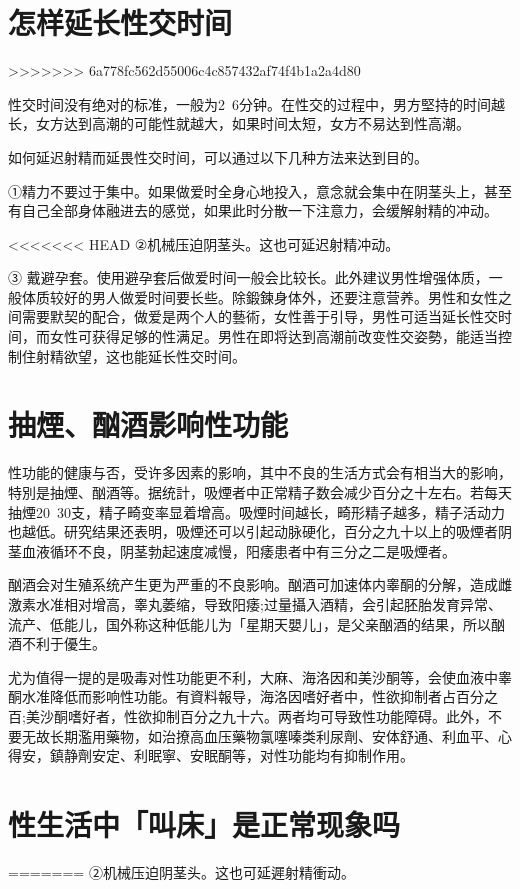 \documentclass[12pt,UTF8]{ctexbook}
\begin{document}
\section{怎样延长性交时间}
>>>>>>> 6a778fc562d55006c4c857432af74f4b1a2a4d80

性交时间没有绝对的标准，一般为2~6分钟。在性交的过程中，男方堅持的时间越长，女方达到高潮的可能性就越大，如果时间太短，女方不易达到性高潮。

如何延迟射精而延畏性交时间，可以通过以下几种方法来达到目的。

①精力不要过于集中。如果做爱时全身心地投入，意念就会集中在阴茎头上，甚至有自己全部身体融进去的感觉，如果此时分散一下注意力，会缓解射精的冲动。

<<<<<<< HEAD
②机械压迫阴茎头。这也可延迟射精冲动。

③ 戴避孕套。使用避孕套后做爱时间一般会比较长。此外建议男性增强体质，一般体质较好的男人做爱时间要长些。除鍛鍊身体外，还要注意营养。男性和女性之间需要默契的配合，做爱是两个人的藝術，女性善于引导，男性可适当延长性交时间，而女性可获得足够的性满足。男性在即将达到高潮前改变性交姿勢，能适当控制住射精欲望，这也能延长性交时间。

\section{抽煙、酗酒影响性功能}

性功能的健康与否，受许多因素的影响，其中不良的生活方式会有相当大的影响，特別是抽煙、酗酒等。据统計，吸煙者中正常精子数会减少百分之十左右。若每天抽煙20~30支，精子畸变率显着增高。吸煙时间越长，畸形精子越多，精子活动力也越低。研究结果还表明，吸煙还可以引起动脉硬化，百分之九十以上的吸煙者阴茎血液循环不良，阴茎勃起速度减慢，阳痿患者中有三分之二是吸煙者。

酗酒会对生殖系统产生更为严重的不良影响。酗酒可加速体内睾酮的分解，造成雌激素水准相对增高，睾丸萎缩，导致阳痿;过量攝入酒精，会引起胚胎发育异常、流产、低能儿，国外称这种低能儿为「星期天嬰儿」，是父亲酗酒的结果，所以酗酒不利于優生。

尤为值得一提的是吸毒对性功能更不利，大麻、海洛因和美沙酮等，会使血液中睾酮水准降低而影响性功能。有資料報导，海洛因嗜好者中，性欲抑制者占百分之百;美沙酮嗜好者，性欲抑制百分之九十六。两者均可导致性功能障碍。此外，不要无故长期濫用藥物，如治撩高血压藥物氯噻嗪类利尿劑、安体舒通、利血平、心得安，鎮静劑安定、利眠寧、安眠酮等，对性功能均有抑制作用。

\section{性生活中「叫床」是正常现象吗}
=======
②机械压迫阴茎头。这也可延遲射精衝动。
\end{document}
